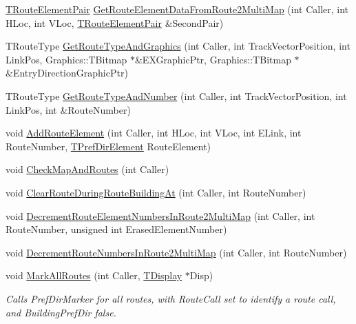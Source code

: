 \begin{DoxyCompactItemize}
\item 
\mbox{\hyperlink{class_t_all_routes_a159a7d547e3d435d109a36cb41193a78}{T\+Route\+Element\+Pair}} \mbox{\hyperlink{class_t_all_routes_a7eda7a4b535c7538e217bbbc4d878071}{Get\+Route\+Element\+Data\+From\+Route2\+Multi\+Map}} (int Caller, int H\+Loc, int V\+Loc, \mbox{\hyperlink{class_t_all_routes_a159a7d547e3d435d109a36cb41193a78}{T\+Route\+Element\+Pair}} \&Second\+Pair)
\item 
T\+Route\+Type \mbox{\hyperlink{class_t_all_routes_afbb161c646677f13755041b895a23982}{Get\+Route\+Type\+And\+Graphics}} (int Caller, int Track\+Vector\+Position, int Link\+Pos, Graphics\+::\+T\+Bitmap $\ast$\&E\+X\+Graphic\+Ptr, Graphics\+::\+T\+Bitmap $\ast$\&Entry\+Direction\+Graphic\+Ptr)
\item 
T\+Route\+Type \mbox{\hyperlink{class_t_all_routes_a0a9ccbc84687f85806115877aa86dcfd}{Get\+Route\+Type\+And\+Number}} (int Caller, int Track\+Vector\+Position, int Link\+Pos, int \&Route\+Number)
\item 
void \mbox{\hyperlink{class_t_all_routes_a6eaa33fa8e8dcb44d0671be5889305a9}{Add\+Route\+Element}} (int Caller, int H\+Loc, int V\+Loc, int E\+Link, int Route\+Number, \mbox{\hyperlink{class_t_pref_dir_element}{T\+Pref\+Dir\+Element}} Route\+Element)
\item 
void \mbox{\hyperlink{class_t_all_routes_a54e5483e7b01daf50436e3dcc8794e77}{Check\+Map\+And\+Routes}} (int Caller)
\item 
void \mbox{\hyperlink{class_t_all_routes_ab23a53bd95aeb951108a004735b9a45e}{Clear\+Route\+During\+Route\+Building\+At}} (int Caller, int Route\+Number)
\item 
void \mbox{\hyperlink{class_t_all_routes_a5ebf1d3fbba09f98acc23b7d18822e9e}{Decrement\+Route\+Element\+Numbers\+In\+Route2\+Multi\+Map}} (int Caller, int Route\+Number, unsigned int Erased\+Element\+Number)
\item 
void \mbox{\hyperlink{class_t_all_routes_a5b18fe89f84962fca0a86063043b2a75}{Decrement\+Route\+Numbers\+In\+Route2\+Multi\+Map}} (int Caller, int Route\+Number)
\item 
\mbox{\label{class_t_all_routes_af0a34aa05027527d256566ae52600583}} 
void \mbox{\hyperlink{class_t_all_routes_af0a34aa05027527d256566ae52600583}{Mark\+All\+Routes}} (int Caller, \mbox{\hyperlink{class_t_display}{T\+Display}} $\ast$Disp)
\begin{DoxyCompactList}\small\item\em Calls Pref\+Dir\+Marker for all routes, with Route\+Call set to identify a route call, and Building\+Pref\+Dir false. \end{DoxyCompactList}\item 

\end{DoxyCompactItemize}
